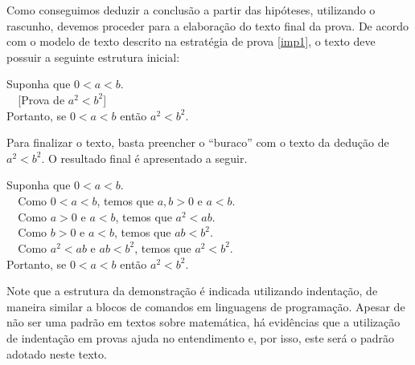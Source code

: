 \begin{Example}
Como conseguimos deduzir a conclusão a partir das hipóteses,
utilizando o rascunho, devemos proceder para a elaboração do texto
final da prova. De acordo com o modelo de texto descrito na estratégia
de prova \ref{imp1}, o texto deve possuir a seguinte estrutura
inicial:
\begin{flushleft}
Suponha que $0< a < b$.\\
\verb|  |[Prova de $a^2 < b^2$]\\
Portanto, se $0 < a < b$ então $a^2 < b^2$.
\end{flushleft}
Para finalizar o texto, basta preencher o ``buraco'' com o texto da
dedução de $a^2 < b^2$.  O resultado final é apresentado a seguir.
\begin{flushleft}
Suponha que $0< a < b$.\\
\verb|  |Como $0< a < b$, temos que $a,b > 0$ e $a < b$.\\
\verb|  |Como $a > 0$ e $a < b$, temos que $a^2 < ab$.\\
\verb|  |Como $b > 0$ e $a < b$, temos que $ab < b^2$.\\
\verb|  |Como $a^2 < ab$ e $ab < b^2$, temos que $a^2 < b^2$.\\
Portanto, se $0 < a < b$ então $a^2 < b^2$.
\end{flushleft}
\end{Example}
Note que a estrutura da demonstração é indicada utilizando indentação,
de maneira similar a blocos de comandos em linguagens de
programação. Apesar de não ser uma padrão em textos sobre matemática,
há evidências que a utilização de indentação em provas ajuda no
entendimento \cite{Lamport12} e, por isso, este será o padrão adotado
neste texto.